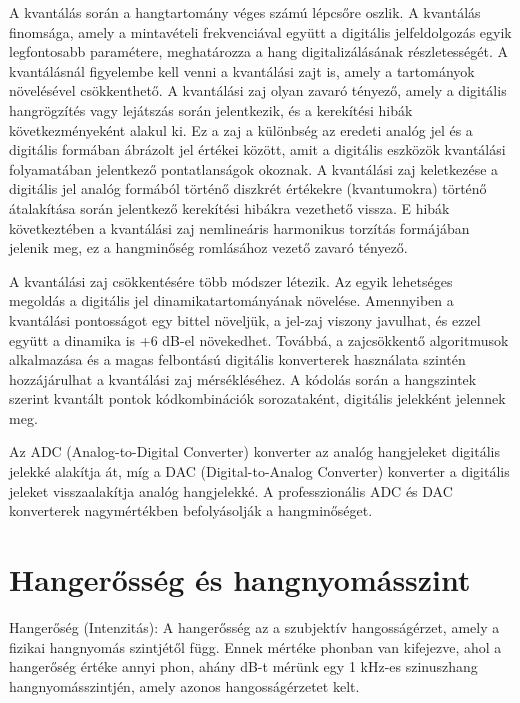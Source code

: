 A kvantálás során a hangtartomány véges számú lépcsőre oszlik. 
A kvantálás finomsága, amely a mintavételi frekvenciával együtt a digitális jelfeldolgozás 
egyik legfontosabb paramétere, meghatározza a hang digitalizálásának részletességét. 
A kvantálásnál figyelembe kell venni a kvantálási zajt is, amely a tartományok növelésével csökkenthető.
A kvantálási zaj olyan zavaró tényező, amely a digitális hangrögzítés vagy lejátszás során jelentkezik, 
és a kerekítési hibák következményeként alakul ki. Ez a zaj a különbség az eredeti analóg jel és a 
digitális formában ábrázolt jel értékei között, amit a digitális eszközök kvantálási folyamatában jelentkező pontatlanságok okoznak.
A kvantálási zaj keletkezése a digitális jel analóg formából történő diszkrét értékekre (kvantumokra) 
történő átalakítása során jelentkező kerekítési hibákra vezethető vissza. 
E hibák következtében a kvantálási zaj nemlineáris harmonikus torzítás formájában jelenik meg, ez a hangminőség romlásához vezető zavaró tényező.

A kvantálási zaj csökkentésére több módszer létezik. Az egyik lehetséges megoldás a 
digitális jel dinamikatartományának növelése. Amennyiben a kvantálási pontosságot 
egy bittel növeljük, a jel-zaj viszony javulhat, és ezzel együtt a dinamika is +6 dB-el növekedhet. 
Továbbá, a zajcsökkentő algoritmusok alkalmazása és a magas felbontású digitális konverterek használata szintén hozzájárulhat a kvantálási zaj mérsékléséhez.
A kódolás során a hangszintek szerint kvantált pontok kódkombinációk sorozataként, digitális jelekként jelennek meg.

Az ADC (Analog-to-Digital Converter) konverter az analóg hangjeleket digitális jelekké alakítja át, míg a DAC (Digital-to-Analog Converter) 
konverter a digitális jeleket visszaalakítja analóg hangjelekké. 
A professzionális ADC és DAC konverterek nagymértékben befolyásolják a hangminőséget.
\section{Hangerősség és hangnyomásszint~\cite{SOUNDPRESSURELEVEL}} %
Hangerőség (Intenzitás):
A hangerősség az a szubjektív hangosságérzet, amely a fizikai hangnyomás szintjétől függ. 
Ennek mértéke phonban van kifejezve, ahol a hangerőség értéke annyi phon, ahány dB-t mérünk 
egy 1 kHz-es szinuszhang hangnyomásszintjén, amely azonos hangosságérzetet kelt.

